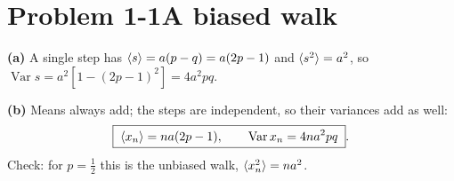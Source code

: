 \documentclass[11pt]{article}
\newcommand{\ans}[1]{\boxed{\;#1\;}}
\newcommand{\prob}[2]{\section*{Problem #1\quad\normalfont #2}}
\renewcommand{\part}[1]{\par\addvspace{6pt}\noindent\textbf{(#1)}\enspace\ignorespaces}
\begin{document}
\makelecheader

\prob{1-1}{A biased walk}
\part{a}
A single step has $\langle s \rangle=a(p-q)=a(2p-1)$ and $\langle s^2 \rangle=a^2$, so
$\operatorname{Var}s=a^2[1-(2p-1)^2]=4a^2pq$.

\part{b}
Means always add; the steps are independent, so their variances add as well:
\[
  \ans{\avg{x_n}=na(2p-1),\qquad \operatorname{Var}x_n=4na^2pq}.
\]
Check: for $p=\tfrac12$ this is the unbiased walk, $\langle x_n^2 \rangle=na^2$.
\end{document}
